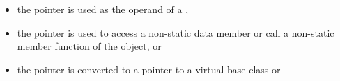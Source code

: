 \begin{itemize}
\item
  the pointer is used as the operand of a ,
%
%
%
%
%
\item
  the pointer is used to access a non-static data member or call a
  non-static member function of the object, or
%
%
%
%
%
\item
  the pointer is converted to a pointer
  to a virtual base class or

\end{itemize}
